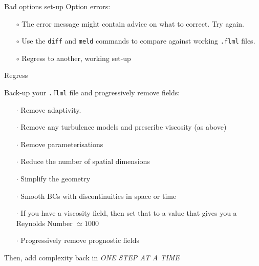 \documentclass[t]{beamer}
\begin{document}

\begin{frame}{Bad options set-up}
Option errors:
\vspace{1ex}
\begin{itemize}
 \item[$\circ$] The error message might contain advice on what to correct. Try again.
 \item[$\circ$] Use the {\tt diff} and {\tt meld} commands to compare against working {\tt .flml} files.
 \item[$\circ$] Regress to another, working set-up
\end{itemize}
\end{frame}


\begin{frame}{Regress}

Back-up your {\tt .flml} file and progressively remove fields:
\begin{itemize}
 \item[$\cdot$] Remove adaptivity.
 \item[$\cdot$] Remove any turbulence models and prescribe viscosity (as above)
 \item[$\cdot$] Remove parameterisations
 \item[$\cdot$] Reduce the number of spatial dimensions
 \item[$\cdot$] Simplify the geometry 
 \item[$\cdot$] Smooth BCs with discontinuities in space or time
 \item[$\cdot$] If you have a viscosity field, then set that to a value that gives you a Reynolds Number $\simeq 1000$
 \item[$\cdot$] Progressively remove prognostic fields
\end{itemize}
Then, add complexity back in \emph{\color{red}ONE STEP AT A TIME}

\end{frame}

\end{document}
